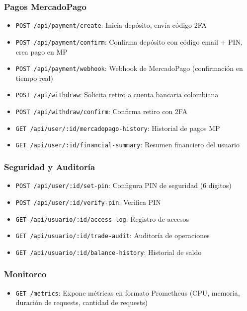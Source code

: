 \documentclass[12pt,oneside]{article}
\begin{document}
\subsubsection{Pagos MercadoPago}
\begin{itemize}
    \item \texttt{POST /api/payment/create}: Inicia depósito, envía código 2FA
    \item \texttt{POST /api/payment/confirm}: Confirma depósito con código email + PIN, crea pago en MP
    \item \texttt{POST /api/payment/webhook}: Webhook de MercadoPago (confirmación en tiempo real)
    \item \texttt{POST /api/withdraw}: Solicita retiro a cuenta bancaria colombiana
    \item \texttt{POST /api/withdraw/confirm}: Confirma retiro con 2FA
    \item \texttt{GET /api/user/:id/mercadopago-history}: Historial de pagos MP
    \item \texttt{GET /api/user/:id/financial-summary}: Resumen financiero del usuario
\end{itemize}

\subsubsection{Seguridad y Auditoría}
\begin{itemize}
    \item \texttt{POST /api/user/:id/set-pin}: Configura PIN de seguridad (6 dígitos)
    \item \texttt{POST /api/user/:id/verify-pin}: Verifica PIN
    \item \texttt{GET /api/usuario/:id/access-log}: Registro de accesos
    \item \texttt{GET /api/usuario/:id/trade-audit}: Auditoría de operaciones
    \item \texttt{GET /api/usuario/:id/balance-history}: Historial de saldo
\end{itemize}

\subsubsection{Monitoreo}
\begin{itemize}
    \item \texttt{GET /metrics}: Expone métricas en formato Prometheus (CPU, memoria, duración de requests, cantidad de requests)
\end{itemize}
\end{document}
